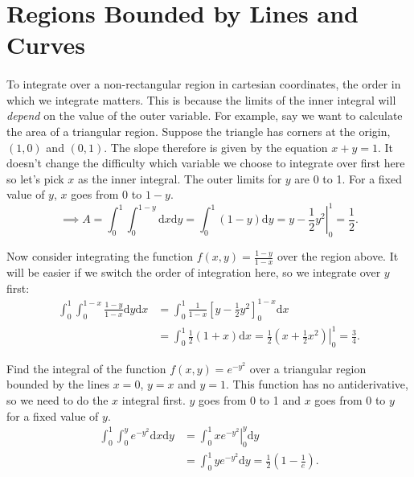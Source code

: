\documentclass[../multivariate_calculus.tex]{subfiles}
\begin{document}
    \section{Regions Bounded by Lines and Curves}
        \paragraph{}
        To integrate over a non-rectangular region in cartesian coordinates, the order in which we integrate matters.
        This is because the limits of the inner integral will \textit{depend} on the value of the outer variable.
        For example, say we want to calculate the area of a triangular region.
        Suppose the triangle has corners at the origin, $(1,0)$ and $(0,1)$.
        The slope therefore is given by the equation $x+y=1$.
        It doesn't change the difficulty which variable we choose to integrate over first here so let's pick $x$ as the inner integral.
        The outer limits for $y$ are 0 to 1.
        For a fixed value of $y$, $x$ goes from 0 to $1-y$.
        \begin{equation}
            \implies A=\int_0^1\int_0^{1-y}\mathrm{d}x\mathrm{d}y=\int_0^1(1-y)\mathrm{d}y=y-\left.\frac{1}{2}y^2\right|_0^1=\frac{1}{2}.
        \end{equation}
        \begin{example}
            Now consider integrating the function $f(x,y)=\frac{1-y}{1-x}$ over the region above.
            It will be easier if we switch the order of integration here, so we integrate over $y$ first:
            \begin{align}
                \int_0^1\int_0^{1-x}\frac{1-y}{1-x}\mathrm{d}y\mathrm{d}x&=\int_0^1\frac{1}{1-x}\left[y-\frac{1}{2}y^2\right]_0^{1-x}\mathrm{d}x\\
                &=\int_0^1\frac{1}{2}(1+x)\mathrm{d}x=\left.\frac{1}{2}\left(x+\frac{1}{2}x^2\right)\right|_0^1=\frac{3}{4}.
            \end{align}
        \end{example}
        \begin{example}
            Find the integral of the function $f(x,y)=e^{-y^2}$ over a triangular region bounded by the lines $x=0$, $y=x$ and $y=1$.
            This function has no antiderivative, so we need to do the $x$ integral first.
            $y$ goes from 0 to 1 and $x$ goes from 0 to $y$ for a fixed value of $y$.
            \begin{align}
                \int_0^1\int_0^y e^{-y^2}\mathrm{d}x\mathrm{d}y&=\int_0^1\left.xe^{-y^2}\right|_0^y\mathrm{d}y\\
                &=\int_0^1 ye^{-y^2}\mathrm{d}y=\frac{1}{2}\left(1-\frac{1}{e}\right).
            \end{align}
        \end{example}
\end{document}
